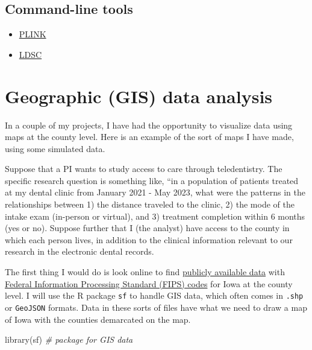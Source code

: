 \documentclass[
]{book}
\newenvironment{Shaded}{\begin{snugshade}}{\end{snugshade}}
\newcommand{\CommentTok}[1]{\textcolor[rgb]{0.56,0.35,0.01}{\textit{#1}}}
\newcommand{\FunctionTok}[1]{\textcolor[rgb]{0.00,0.00,0.00}{#1}}
\newcommand{\NormalTok}[1]{#1}
\begin{document}
\hypertarget{command-line-tools}{%
\section{Command-line tools}\label{command-line-tools}}

\begin{itemize}
\item
  \href{https://www.cog-genomics.org/plink/1.9/}{PLINK}
\item
  \href{https://github.com/bulik/ldsc/wiki/Heritability-and-Genetic-Correlation}{LDSC}
\end{itemize}

\hypertarget{geographic-gis-data-analysis}{%
\chapter{Geographic (GIS) data analysis}\label{geographic-gis-data-analysis}}

In a couple of my projects, I have had the opportunity to visualize data using maps at the county level. Here is an example of the sort of maps I have made, using some simulated data.

Suppose that a PI wants to study access to care through teledentistry. The specific research question is something like, ``in a population of patients treated at my dental clinic from January 2021 - May 2023, what were the patterns in the relationships between 1) the distance traveled to the clinic, 2) the mode of the intake exam (in-person or virtual), and 3) treatment completion within 6 months (yes or no). Suppose further that I (the analyst) have access to the county in which each person lives, in addition to the clinical information relevant to our research in the electronic dental records.

The first thing I would do is look online to find \href{https://geodata.iowa.gov/datasets/iowa::iowa-county-boundaries/explore?location=42.011193\%2C-93.543500\%2C8.00}{publicly available data} with \href{https://en.wikipedia.org/wiki/FIPS_county_code}{Federal Information Processing Standard (FIPS) codes} for Iowa at the county level. I will use the R package \texttt{sf} to handle GIS data, which often comes in \texttt{.shp} or \texttt{GeoJSON} formats. Data in these sorts of files have what we need to draw a map of Iowa with the counties demarcated on the map.

\begin{Shaded}
\begin{Highlighting}[]
\FunctionTok{library}\NormalTok{(sf) }\CommentTok{\# package for GIS data }
\end{Highlighting}
\end{Shaded}
\end{document}
